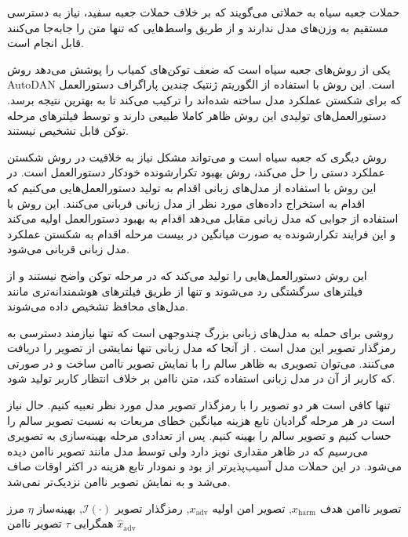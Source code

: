 
حملات جعبه سیاه به حملاتی می‌گویند که بر خلاف حملات جعبه سفید، نیاز به دسترسی مستقیم به وزن‌های مدل ندارند و از طریق واسط‌هایی که تنها متن را جابه‌جا می‌کنند قابل انجام است.

یکی از روش‌های جعبه سیاه است که ضعف توکن‌های کمیاب  را پوشش می‌دهد روش AutoDAN  است. این روش با استفاده از الگوریتم ژنتیک چندین پاراگراف دستورالعمل که برای شکستن عملکرد مدل ساخته شده‌اند را ترکیب می‌کند تا به بهترین نتیجه برسد. دستورالعمل‌های تولیدی این روش ظاهر کاملا طبیعی دارند و توسط فیلترهای مرحله توکن قابل تشخیص نیستند.

روش دیگری که جعبه سیاه است و می‌تواند مشکل نیاز به خلاقیت در روش شکستن عملکرد دستی را حل می‌کند، روش بهبود تکرارشونده خودکار دستورالعمل است. در این روش با استفاده از مدل‌های زبانی اقدام به تولید دستورالعمل‌هایی می‌کنیم که اقدام به استخراج داده‌های مورد نظر از مدل زبانی قربانی می‌کنند. این روش با استفاده از جوابی که مدل زبانی مقابل می‌دهد اقدام به بهبود دستورالعمل اولیه می‌کند و این فرایند تکرارشونده به صورت میانگین در بیست مرحله اقدام به شکستن عملکرد مدل زبانی قربانی می‌شود.

این روش دستورالعمل‌هایی را تولید می‌کند که در مرحله توکن واضح نیستند و از فیلترهای سرگشتگی رد می‌شوند و تنها از طریق فیلترهای هوشمندانه‌تری مانند مدل‌های محافظ تشخیص داده می‌شوند.



روشی برای حمله به مدل‌های زبانی بزرگ چندوجهی است که تنها نیازمند دسترسی به رمزگذار تصویر این مدل است . از آنجا که مدل زبانی تنها نمایشی از تصویر را دریافت می‌کنند. می‌توان تصویری به ظاهر سالم را با نمایش تصویر ناامن ساخت و در صورتی که کاربر از آن در مدل زبانی استفاده کند، متن ناامن بر خلاف انتظار کاربر تولید شود.

تنها کافی است هر دو تصویر را با رمزگذار تصویر مدل مورد نظر تعبیه کنیم. حال نیاز است در هر مرحله گرادیان تابع هزینه میانگین خطای مربعات به نسبت تصویر سالم را حساب کنیم و تصویر سالم را بهینه کنیم. پس از تعدادی مرحله بهینه‌سازی به تصویری می‌رسیم که در ظاهر مقداری نویز دارد ولی توسط مدل مانند تصویر ناامن دیده می‌شود. در این حملات مدل  آسیب‌پذیرتر از  بود و نمودار تابع هزینه  در اکثر اوقات صاف می‌شد و به نمایش تصویر ناامن نزدیک‌تر نمی‌شد.

 تصویر ناامن هدف $x_{\mathrm{harm}}$, تصویر امن اولیه $x_{\mathrm{adv}}$, رمزگذار تصویر $\mathcal{I}(\cdot)$, بهینه‌ساز $\eta$
 مرز همگرایی $\tau$
 تصویر ناامن $\hat{x}_{\mathrm{adv}}$


